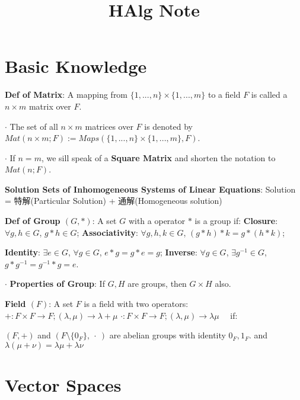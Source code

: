 \documentclass[9pt]{article}
\title{HAlg Note}
\author{}
\date{}
\begin{document}
\maketitle
\thispagestyle{fancy}
\vspace{-3.5cm}

\fontsize{10pt}{11pt}\selectfont
\setlength{\parindent}{8pt}


\section{Basic Knowledge} %

\textbf{Def of Matrix}: A mapping from $\{1,...,n\}\times\{1,...,m\}$ to a field $F$ is called a $n\times m$ matrix over $F$.

$\cdot$ The set of all $n\times m$ matrices over $F$ is denoted by $Mat(n\times m;F):=Maps(\{1,...,n\}\times\{1,...,m\},F)$.

$\cdot$ If $n=m$, we sill speak of a \textbf{Square Matrix} and shorten the notation to $Mat(n;F)$.

\textbf{Solution Sets of Inhomogeneous Systems of Linear Equations}: {\small Solution = 特解(Particular Solution) + 通解(Homogeneous solution)}

\textbf{Def of Group $(G,*)$}: A set $G$ with a operator $*$ is a group if: {\small \textbf{Closure}: $\forall g,h\in G$, $g*h\in G$; \textbf{Associativity}: $\forall g,h,k\in G$, $(g*h)*k=g*(h*k)$;}

\hspace{85pt} {\small \textbf{Identity}: $\exists e\in G$, $\forall g\in G$, $e*g=g*e=g$; \textbf{Inverse}: $\forall g\in G$, $\exists g^{-1}\in G$, $g*g^{-1}=g^{-1}*g=e$.}

$\cdot$ \textbf{Properties of Group}: If $G,H$ are groups, then $G\times H$ also.

\textbf{Field $(F)$}: A set $F$ is a field with two operators: $+:F\times F\to F;(\lambda,\mu)\to\lambda+\mu$ $\cdot:F\times F\to F;(\lambda,\mu)\to\lambda\mu$ \ \ if:

\quad \quad \quad \quad $(F,+)$ and $(F\setminus\{0_F\}, \ \cdot \ )$ are abelian groups with identity $0_F,1_F$. \quad and \quad $\lambda(\mu+\nu)=\lambda\mu+\lambda\nu$


\section{Vector Spaces} %
\end{document}
